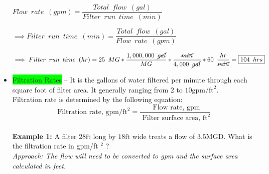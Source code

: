 \documentclass{article}
\begin{document}
\begin{itemize}
\vspace{0.2cm}

$Flow \enspace rate \enspace (gpm)=\dfrac{Total \enspace flow \enspace (gal)}{Filter \enspace run \enspace time \enspace (min)}$

\vspace{0.3cm}

$\implies Filter \enspace run \enspace time \enspace (min)=\dfrac{Total \enspace flow \enspace (gal)}{Flow \enspace rate \enspace (gpm)}$\\

\vspace{0.3cm}

$\implies Filter \enspace run \enspace time \enspace (hr)=25 \enspace MG*\dfrac{1,000,000 \enspace \cancel{gal}}{MG}*\dfrac{\cancel{min}}{4,000 \enspace \cancel{gal}}*60 \enspace \dfrac{hr}{\cancel{min}}=\boxed{104 \enspace hrs}$

 

 

\item \colorbox{lime}{Filtration Rates} – It is the gallons of water filtered per minute through each square foot of filter area.  It generally ranging from 2 to $10 \mathrm{gpm} / \mathrm{ft}^{2}$.\\

Filtration rate is determined by the following equation:\\
$$
\text { Filtration rate, } \mathrm{gpm} / \mathrm{ft}^{2}=\frac{\text { Flow rate, } \mathrm{gpm}}{\text { Filter surface area, } \mathrm{ft}^{2}}
$$\\

\textbf{Example 1:} A filter $28 \mathrm{ft}$ long by $18 \mathrm{ft}$ wide treats a flow of $3.5 \mathrm{MGD}$. What is the filtration rate in gpm/ft ${ }^{2}$ ?\\

\vspace{0.2cm}
\textit{Approach:  The flow will need to be converted to gpm and the surface area calculated in feet.}\\


\end{itemize}
\end{document}
